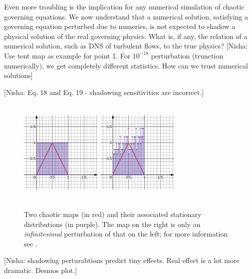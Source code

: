 Even more troubling is the implication for any numerical simulation of chaotic
governing equations.  We now understand that a numerical solution, satisfying
a governing equation perturbed due to numerics, is not expected to shadow a
physical solution of the real governing physics.  What is, if any, the
relation of a numerical solution, such as DNS of turbulent flows, to
the true physics?
[Nisha: Use tent map as example for point 1. For $10^{-18}$ perturbation (trunction numerically), we get completely different statistics. How can we trust numerical solutions]

[Nisha: Eq. 18 and Eq. 19 - shadowing sensitivities are incorrect.]

\begin{figure}
    \centering
    \includegraphics[width=0.35\textwidth,height=2in]{figure/mapn0s0.png}
    \includegraphics[width=0.35\textwidth,height=2in]{figure/mapn5s0.1.png}
    \caption{Two chaotic maps (in red) and their associated stationary  distributions (in purple). The map on the right is only an \emph{infinitesimal} perturbation of that on the left; for more information see \cite{desmos}.}
    \label{fig:map}
\end{figure}
[Nisha: shadowing perturabtions predict tiny effects. Real effect is a lot more dramatic. Desmos plot.]



